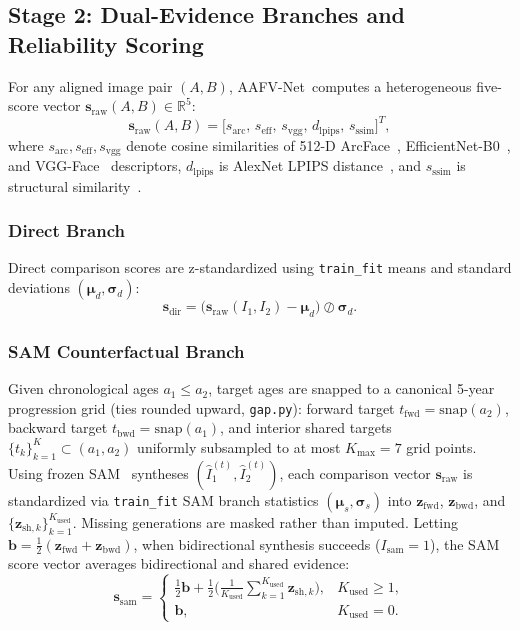 \documentclass[journal]{IEEEtran}
\newcommand{\sys}{AAFV-Net}
\newcommand{\vect}[1]{\mathbf{#1}}
\begin{document}
\subsection{Stage 2: Dual-Evidence Branches and Reliability Scoring}
\label{sec:stage2}
For any aligned image pair $(A, B)$, \sys\ computes a heterogeneous five-score vector $\vect{s}_{\text{raw}}(A, B) \in \mathbb{R}^5$:
\begin{equation}
\vect{s}_{\text{raw}}(A, B) = \big[ s_{\text{arc}},\, s_{\text{eff}},\, s_{\text{vgg}},\, d_{\text{lpips}},\, s_{\text{ssim}} \big]^T,
\end{equation}
where $s_{\text{arc}}, s_{\text{eff}}, s_{\text{vgg}}$ denote cosine similarities of 512-D ArcFace~\cite{deng2019arcface}, EfficientNet-B0~\cite{tan2019efficientnet}, and VGG-Face~\cite{parkhi2015vgg} descriptors, $d_{\text{lpips}}$ is AlexNet LPIPS distance~\cite{zhang2018lpips}, and $s_{\text{ssim}}$ is structural similarity~\cite{wang2004ssim}.

\subsubsection{Direct Branch}
Direct comparison scores are z-standardized using \texttt{train\_fit} means and standard deviations $(\boldsymbol{\mu}_d, \boldsymbol{\sigma}_d)$:
\begin{equation}
\vect{s}_{\text{dir}} = \big(\vect{s}_{\text{raw}}(I_1, I_2) - \boldsymbol{\mu}_d\big) \oslash \boldsymbol{\sigma}_d.
\end{equation}

\subsubsection{SAM Counterfactual Branch}
Given chronological ages $a_1 \le a_2$, target ages are snapped to a canonical 5-year progression grid (ties rounded upward, \texttt{gap.py}): forward target $t_{\text{fwd}} = \text{snap}(a_2)$, backward target $t_{\text{bwd}} = \text{snap}(a_1)$, and interior shared targets $\{t_k\}_{k=1}^{K} \subset (a_1, a_2)$ uniformly subsampled to at most $K_{\max} = 7$ grid points. Using frozen SAM~\cite{alaluf2021sam} syntheses $(\hat{I}_1^{(t)}, \hat{I}_2^{(t)})$, each comparison vector $\vect{s}_{\text{raw}}$ is standardized via \texttt{train\_fit} SAM branch statistics $(\boldsymbol{\mu}_s, \boldsymbol{\sigma}_s)$ into $\vect{z}_{\text{fwd}}$, $\vect{z}_{\text{bwd}}$, and $\{\vect{z}_{\text{sh},k}\}_{k=1}^{K_{\text{used}}}$. Missing generations are masked rather than imputed. Letting $\vect{b} = \frac{1}{2}(\vect{z}_{\text{fwd}} + \vect{z}_{\text{bwd}})$, when bidirectional synthesis succeeds ($I_{\text{sam}} = 1$), the SAM score vector averages bidirectional and shared evidence:
\begin{equation}
\vect{s}_{\text{sam}} =
\begin{cases}
\frac{1}{2}\vect{b} + \frac{1}{2}\Big(\frac{1}{K_{\text{used}}}\sum_{k=1}^{K_{\text{used}}} \vect{z}_{\text{sh},k}\Big), & K_{\text{used}} \ge 1, \\
\vect{b}, & K_{\text{used}} = 0.
\end{cases}
\end{equation}
\end{document}
